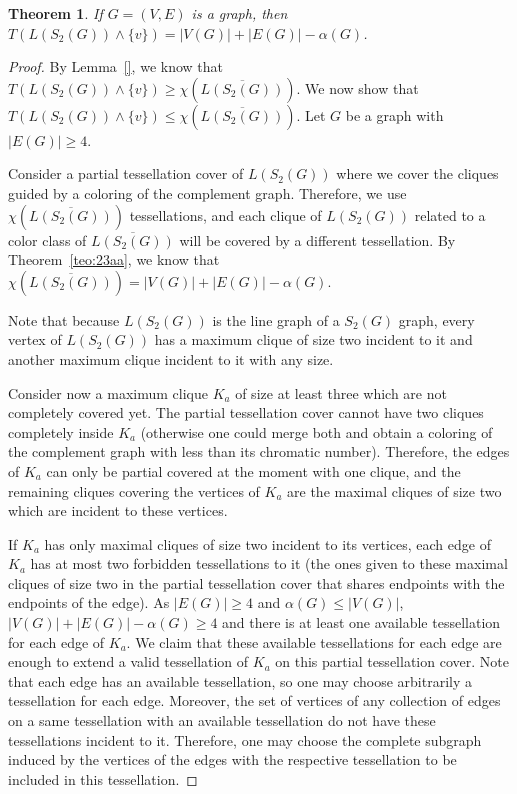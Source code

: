 \documentclass[9pt]{entcs} \usepackage{entcsmacro}
\newtheorem{teo}{Theorem}[section]
\begin{document}
\begin{teo}
If $G=(V, E)$ is a graph, then $T(L(S_2(G))\land \{v\})=|V(G)| + |E(G)| - \alpha(G)$.
\label{teo:23a}
\end{teo}
\begin{proof}
By Lemma~\ref{}, we know that $T(L(S_2(G)) \land \{v\})\geq \chi(\overline{L(S_2(G))})$.
We now show that $T(L(S_2(G))\land\{v\})\leq \chi(\overline{L(S_2(G))})$.
Let $G$ be a graph with $|E(G)| \geq 4$.

Consider a partial tessellation cover of $L(S_2(G))$ where we cover the cliques guided by a coloring of the complement graph. 
Therefore, we use $\chi(\overline{L(S_2(G))})$ tessellations, and each clique of $L(S_2(G))$ related to a color class of $\overline{L(S_2(G))}$ will be covered by a different tessellation.
By Theorem~\ref{teo:23aa}, we know that $\chi(\overline{L(S_2(G))}) = |V(G)| + |E(G)| - \alpha(G)$.

Note that because $L(S_2(G))$ is the line graph of a $S_2(G)$ graph, every vertex of $L(S_2(G))$ has a maximum clique of size two incident to it and another maximum clique incident to it with any size.

Consider now a maximum clique $K_a$ of size at least three which are not completely covered yet.
The partial tessellation cover cannot have two cliques completely inside $K_a$ (otherwise one could merge both and obtain a coloring of the complement graph with less than its chromatic number).
Therefore, the edges of $K_a$ can only be partial covered at the moment with one clique, and 
the remaining cliques covering the vertices of $K_a$ are the maximal cliques of size two which are incident to these vertices.

If $K_a$ has only maximal cliques of size two incident to its vertices, each edge of $K_a$ has at most two forbidden tessellations to it (the ones given to these maximal cliques of size two in the partial tessellation cover that shares endpoints with the endpoints of the edge).
As $|E(G)| \geq 4$ and $\alpha(G) \leq |V(G)|$, $|V(G)| + |E(G)| - \alpha(G) \geq 4$ and there is at least one available tessellation for each edge of $K_a$.
We claim that these available tessellations for each edge are enough to extend a valid tessellation of $K_a$ on this partial tessellation cover.
Note that each edge has an available tessellation, so one may choose arbitrarily a tessellation for each edge.
Moreover, the set of vertices of any collection of edges on a same tessellation with an available tessellation do not have these tessellations incident to it.
Therefore, one may choose the complete subgraph induced by the vertices of the edges with the respective tessellation to be included in this tessellation.


\end{proof}
\end{document}
